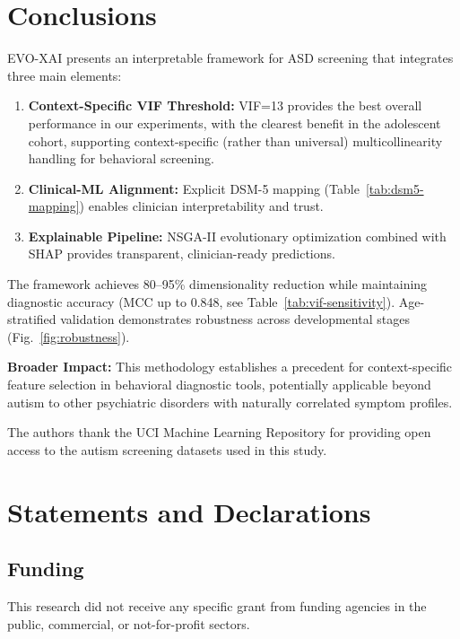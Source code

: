 \documentclass[pdflatex,sn-vancouver-num]{sn-jnl}
\begin{document}
\section{Conclusions}\label{conclusions}

EVO-XAI presents an interpretable framework for ASD screening that integrates three main elements:

\begin{enumerate}
\def\labelenumi{\arabic{enumi}.}
\item
  \textbf{Context-Specific VIF Threshold:} VIF=13 provides the best overall performance in our experiments, with the clearest benefit in the adolescent cohort, supporting context-specific (rather than universal) multicollinearity handling for behavioral screening.
\item
  \textbf{Clinical-ML Alignment:} Explicit DSM-5 mapping (Table~\ref{tab:dsm5-mapping}) enables clinician interpretability and trust.
\item
  \textbf{Explainable Pipeline:} NSGA-II evolutionary optimization combined with SHAP provides transparent, clinician-ready predictions.
\end{enumerate}

The framework achieves 80--95\% dimensionality reduction while maintaining diagnostic accuracy (MCC up to 0.848, see Table~\ref{tab:vif-sensitivity}). Age-stratified validation demonstrates robustness across developmental stages (Fig.~\ref{fig:robustness}).

\textbf{Broader Impact:} This methodology establishes a precedent for context-specific feature selection in behavioral diagnostic tools, potentially applicable beyond autism to other psychiatric disorders with naturally correlated symptom profiles.

\backmatter


The authors thank the UCI Machine Learning Repository for providing open access to the autism screening datasets used in this study.

\section*{Statements and Declarations}

\subsection*{Funding}
This research did not receive any specific grant from funding agencies in the public, commercial, or not-for-profit sectors.
\end{document}
